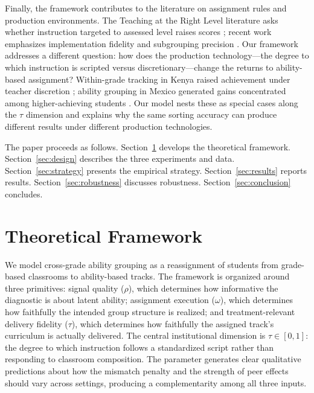 \documentclass[11pt]{article}
\begin{document}
Finally, the framework contributes to the literature on assignment rules and production environments. The Teaching at the Right Level literature asks whether instruction targeted to assessed level raises scores \citep{banerjee2017proof,duflo2020experimental}; recent work emphasizes implementation fidelity and subgrouping precision \citep{angristmeager2023}. Our framework addresses a different question: how does the production technology---the degree to which instruction is scripted versus discretionary---change the returns to ability-based assignment? Within-grade tracking in Kenya raised achievement under teacher discretion \citep{duflo2011peer}; ability grouping in Mexico generated gains concentrated among higher-achieving students \citep{bussofrisancho2023}. Our model nests these as special cases along the $\tau$ dimension and explains why the same sorting accuracy can produce different results under different production technologies.

The paper proceeds as follows. Section~\ref{sec:theory} develops the theoretical framework. Section~\ref{sec:design} describes the three experiments and data. Section~\ref{sec:strategy} presents the empirical strategy. Section~\ref{sec:results} reports results. Section~\ref{sec:robustness} discusses robustness. Section~\ref{sec:conclusion} concludes.

\section{Theoretical Framework}
\label{sec:theory}

We model cross-grade ability grouping as a reassignment of students from grade-based classrooms to ability-based tracks. The framework is organized around three primitives: signal quality ($\rho$), which determines how informative the diagnostic is about latent ability; assignment execution ($\omega$), which determines how faithfully the intended group structure is realized; and treatment-relevant delivery fidelity ($\tau$), which determines how faithfully the assigned track's curriculum is actually delivered. The central institutional dimension is $\tau \in [0,1]$: the degree to which instruction follows a standardized script rather than responding to classroom composition. The parameter generates clear qualitative predictions about how the mismatch penalty and the strength of peer effects should vary across settings, producing a complementarity among all three inputs.
\end{document}
